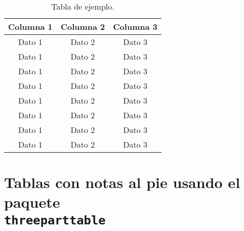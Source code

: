 \begin{table}[!ht]
  \caption{Tabla de ejemplo.}
  \centering
  \begin{tabular}{ccc}

    \toprule
    \textbf{Columna 1} & \textbf{Columna 2} & \textbf{Columna 3}\\
    \midrule
    Dato 1             & Dato 2             & Dato 3\\
    Dato 1             & Dato 2             & Dato 3\\
    Dato 1             & Dato 2             & Dato 3\\
    Dato 1             & Dato 2             & Dato 3\\
    Dato 1             & Dato 2             & Dato 3\\
    Dato 1             & Dato 2             & Dato 3\\
    Dato 1             & Dato 2             & Dato 3\\
    Dato 1             & Dato 2             & Dato 3\\
    \bottomrule

  \end{tabular}
  \label{tab:ejemplo1}
\end{table}

\lipsum[10]

\section[Tablas con notas al pie]{Tablas con notas al pie usando el paquete\\ {\normalfont\large\texttt{threeparttable}}}
\lipsum[11]


